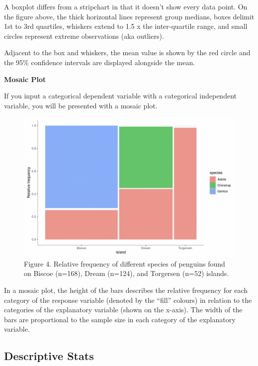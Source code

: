 \documentclass[
]{book}
\begin{document}
A boxplot differs from a stripchart in that it doesn't show every data point. On the figure above, the thick horizontal lines represent group medians, boxes delimit 1st to 3rd quartiles, whiskers extend to 1.5 x the inter-quartile range, and small circles represent extreme observations (aka outliers).

Adjacent to the box and whiskers, the mean value is shown by the red circle and the 95\% confidence intervals are displayed alongside the mean.

\textbf{Mosaic Plot}

If you input a categorical dependent variable with a categorical independent variable, you will be presented with a mosaic plot.

\begin{figure}
\centering
\includegraphics{figures_images/mosaic_plot_ex.png}
\caption{Figure 4. Relative frequency of different species of penguins found on Biscoe (n=168), Dream (n=124), and Torgersen (n=52) islands.}
\end{figure}

In a mosaic plot, the height of the bars describes the relative frequency for each category of the response variable (denoted by the ``fill'' colours) in relation to the categories of the explanatory variable (shown on the x-axis). The width of the bars are proportional to the sample size in each category of the explanatory variable.

\hypertarget{descriptive-stats-1}{%
\subsection*{Descriptive Stats}\label{descriptive-stats-1}}
\end{document}
